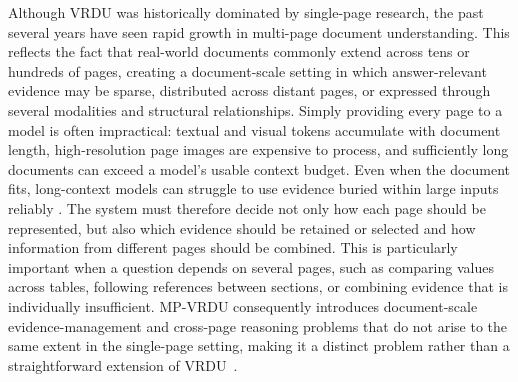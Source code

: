 \documentclass[11pt,twoside,openany]{report}
\begin{document}
Although VRDU was historically dominated by single-page research, the past several years have seen rapid growth in multi-page document understanding. This reflects the fact that real-world documents commonly extend across tens or hundreds of pages, creating a document-scale setting in which answer-relevant evidence may be sparse, distributed across distant pages, or expressed through several modalities and structural relationships. Simply providing every page to a model is often impractical: textual and visual tokens accumulate with document length, high-resolution page images are expensive to process, and sufficiently long documents can exceed a model's usable context budget. Even when the document fits, long-context models can struggle to use evidence buried within large inputs reliably \citep{liu2024lost}. The system must therefore decide not only how each page should be represented, but also which evidence should be retained or selected and how information from different pages should be combined. This is particularly important when a question depends on several pages, such as comparing values across tables, following references between sections, or combining evidence that is individually insufficient. MP-VRDU consequently introduces document-scale evidence-management and cross-page reasoning problems that do not arise to the same extent in the single-page setting, making it a distinct problem rather than a straightforward extension of VRDU~\cite{xu2026managing}.

\end{document}
